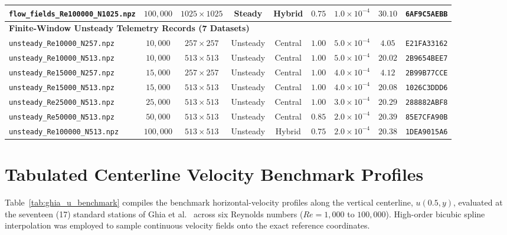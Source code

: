 \documentclass[11pt,a4paper]{article}
\begin{document}
\begin{table}[htbp]
{\begin{tabular}{lcccccccl}
\texttt{flow\_fields\_Re100000\_N1025.npz} & $100,000$ & $1025 \times 1025$ & Steady & Hybrid  & $0.75$ & $1.0 \times 10^{-4}$ & $30.10$ & \texttt{6AF9C5AEBB} \\
\midrule
\multicolumn{9}{l}{\textbf{Finite-Window Unsteady Telemetry Records (7 Datasets)}} \\
\midrule
\texttt{unsteady\_Re10000\_N257.npz}       & $10,000$  & $257 \times 257$   & Unsteady & Central & $1.00$ & $5.0 \times 10^{-4}$ & $4.05$  & \texttt{E21FA33162} \\
\texttt{unsteady\_Re10000\_N513.npz}       & $10,000$  & $513 \times 513$   & Unsteady & Central & $1.00$ & $5.0 \times 10^{-4}$ & $20.02$ & \texttt{2B9654BEE7} \\
\texttt{unsteady\_Re15000\_N257.npz}       & $15,000$  & $257 \times 257$   & Unsteady & Central & $1.00$ & $4.0 \times 10^{-4}$ & $4.12$  & \texttt{2B99B77CCE} \\
\texttt{unsteady\_Re15000\_N513.npz}       & $15,000$  & $513 \times 513$   & Unsteady & Central & $1.00$ & $4.0 \times 10^{-4}$ & $20.08$ & \texttt{1026C3DDD6} \\
\texttt{unsteady\_Re25000\_N513.npz}       & $25,000$  & $513 \times 513$   & Unsteady & Central & $1.00$ & $3.0 \times 10^{-4}$ & $20.29$ & \texttt{288882ABF8} \\
\texttt{unsteady\_Re50000\_N513.npz}       & $50,000$  & $513 \times 513$   & Unsteady & Central & $0.85$ & $2.0 \times 10^{-4}$ & $20.39$ & \texttt{85E7CFA90B} \\
\texttt{unsteady\_Re100000\_N513.npz}      & $100,000$ & $513 \times 513$   & Unsteady & Hybrid  & $0.75$ & $2.0 \times 10^{-4}$ & $20.38$ & \texttt{1DEA9015A6} \\
\bottomrule
\end{tabular}%
}
\end{table}

\section{Tabulated Centerline Velocity Benchmark Profiles}
\label{sec:appendix_velocities}
\setcounter{table}{0}

Table~\ref{tab:ghia_u_benchmark} compiles the benchmark horizontal-velocity profiles along the vertical centerline, $u(0.5, y)$, evaluated at the seventeen (17) standard stations of Ghia et al.~\cite{ghia1982high} across six Reynolds numbers ($Re = 1{,}000$ to $100{,}000$). High-order bicubic spline interpolation was employed to sample continuous velocity fields onto the exact reference coordinates.
\end{document}
